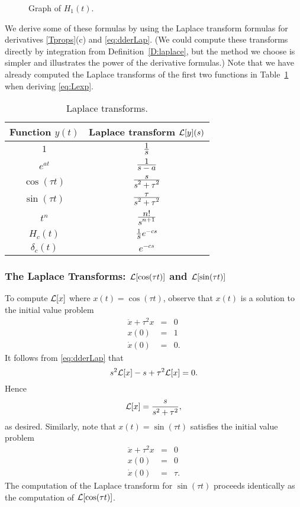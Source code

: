 \documentclass{ximera}
\begin{document}
\begin{figure}[htb]
           \centerline{%
           }
           \caption{Graph of $H_1(t)$.}
           \label{F:H1}
\end{figure}

We derive some of these formulas by using the Laplace transform formulas for 
derivatives \eqref{Tprops}(c) and \eqref{eq:dderLap}.  (We could compute these 
transforms directly by integration from Definition~\ref{D:laplace}, but the 
method we choose is simpler and illustrates the power of the derivative 
formulas.)  Note that we have already computed the Laplace transforms 
of the first two functions in Table~\ref{tab:Laplist} when deriving 
\eqref{eq:Lexp}.

\begin{table}[htb]
\begin{center}
\begin{tabular}{|c|c|}
\hline
Function $y(t)$ & Laplace transform ${\cal L}[y](s)$\\
\hline
$1$ & $\frac{\displaystyle 1}{\displaystyle s}$\\
$e^{at}$ & $\frac{\displaystyle 1}{\displaystyle s-a}$\\
$\cos(\tau t)$ & $\frac{\displaystyle s}{\displaystyle s^2 + \tau^2}$\\
$\sin(\tau t)$ & $\frac{\displaystyle \tau}{\displaystyle s^2 + \tau^2}$\\
$t^n$ & $\frac{\displaystyle n!}{\displaystyle s^{n+1}}$\\
$H_c(t)$ & $\frac{1}{\displaystyle s}e^{-cs}$\\
$\delta_c(t)$ & $e^{-cs}$\\
\hline
\end{tabular}
\end{center}
\caption{Laplace transforms.}
\label{tab:Laplist}
\end{table}


\subsubsection*{The Laplace Transforms: ${\cal L}[\cos(\tau t)]$ and 
${\cal L}[\sin(\tau t)]$}

To compute ${\cal L}[x]$ where $x(t)=\cos(\tau t)$, observe that $x(t)$ is 
a solution to the initial value problem
\begin{eqnarray*}
\ddot{x}+\tau^2 x & = & 0\\ 
x(0) & = & 1 \\ 
\dot{x}(0) & = & 0.
\end{eqnarray*}
It follows from \eqref{eq:dderLap} that
\[
s^2{\cal L}[x] - s + \tau^2 {\cal L}[x] = 0.
\]
Hence
\[
{\cal L}[x] = \frac{s}{s^2+\tau^2},
\]
as desired.  Similarly, note that $x(t)=\sin(\tau t)$ satisfies the initial
value problem
\begin{eqnarray*}
\ddot{x}+\tau^2 x & = & 0 \\
  x(0) & = & 0 \\
 \dot{x}(0) & = & \tau.
\end{eqnarray*}
The computation of the Laplace transform for $\sin(\tau t)$ proceeds
identically as the computation of ${\cal L}[\cos(\tau t)]$.
\end{document}
